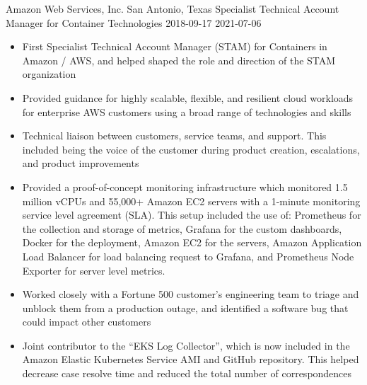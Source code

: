 \roleheader
    {Amazon Web Services, Inc.}
    {San Antonio, Texas}
    {Specialist Technical Account Manager for Container Technologies}
    {2018-09-17}
    {2021-07-06}

\begin{itemize}

    \item First Specialist Technical Account Manager (STAM) for Containers in Amazon / AWS, and helped shaped the role and direction of the STAM organization

    \item Provided guidance for highly scalable, flexible, and resilient cloud workloads for enterprise AWS customers using a broad range of technologies and skills

    \item Technical liaison between customers, service teams, and support. This included being the voice of the customer during product creation, escalations, and product improvements

    \item Provided a proof-of-concept monitoring infrastructure which monitored 1.5 million vCPUs and 55,000+ Amazon EC2 servers with a 1-minute monitoring service level agreement (SLA). This setup included the use of: Prometheus for the collection and storage of metrics, Grafana for the custom dashboards, Docker for the deployment, Amazon EC2 for the servers, Amazon Application Load Balancer for load balancing request to Grafana, and Prometheus Node Exporter for server level metrics.

    \item Worked closely with a Fortune 500 customer's engineering team to triage and unblock them from a production outage, and identified a software bug that could impact other customers

    \item Joint contributor to the ``EKS Log Collector'', which is now included in the Amazon Elastic Kubernetes Service AMI and GitHub repository. This helped decrease case resolve time and reduced the total number of correspondences

\end{itemize}
